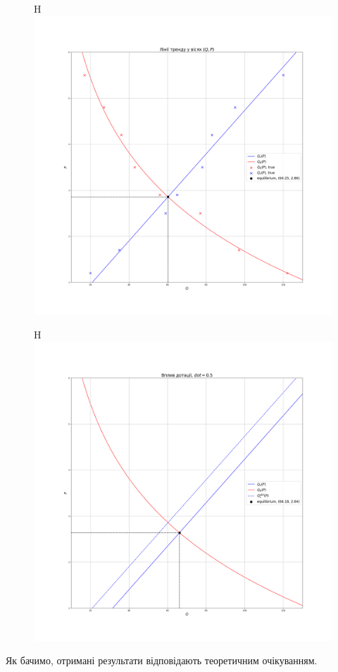 \begin{figure}{H}
	\centering
	\includegraphics[width=\textwidth]{q_p.png}
\end{figure}

\begin{figure}{H}
	\centering
	\includegraphics[width=\textwidth]{dotation.png}
\end{figure}

Як бачимо, отримані результати відповідають теоретичним очікуванням.

